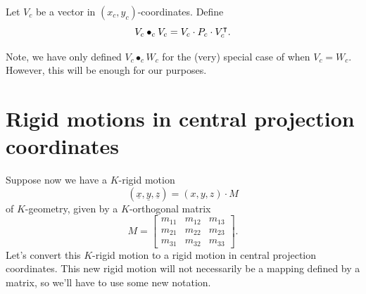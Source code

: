 \documentclass{ximera}
\begin{document}
\begin{definition}
  Let $V_c$ be a vector in $(x_c,y_c)$-coordinates. Define
  \[
  V_c \bullet_c V_c = V_c \cdot P_c \cdot V_c^\intercal.
  \]
\end{definition}

\begin{warning}
  Note, we have only defined $V_c\bullet_c W_c$ for the (very) special
  case of when $V_c = W_c$. However, this will be enough for our
  purposes.
\end{warning}











\section{Rigid motions in central projection coordinates}

Suppose now we have a $K$-rigid motion
\[
\left(  \underline{x},\underline{y},\underline{z}\right)  =\left(
x,y,z\right)  \cdot M
\]
of $K$-geometry, given by a $K$-orthogonal matrix%
\[
M=\begin{bmatrix}
m_{11} & m_{12} & m_{13}\\
m_{21} & m_{22} & m_{23}\\
m_{31} & m_{32} & m_{33}
\end{bmatrix}.
\]
Let's convert this $K$-rigid motion to a rigid motion in central
projection coordinates. This new rigid motion will not necessarily be
a mapping defined by a matrix, so we'll have to use some new notation.


\begin{image}
\end{image}
\end{document}
